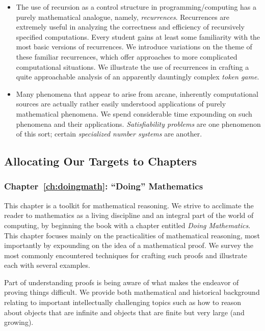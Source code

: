 \begin{enumerate}
\begin{itemize}
\medskip\item
The use of recursion as a control structure in programming/computing has a purely mathematical analogue, namely, {\em recurrences}.  Recurrences are extremely useful in analyzing the correctness and efficiency of recursively specified computations.  Every student gains at least some familiarity with the most basic versions of recurrences.  We introduce variations on the theme of these familiar recurrences, which offer approaches to more complicated computational situations.  We illustrate the use of recurrences in crafting a quite approachable analysis of an apparently dauntingly complex {\em token game}.
\medskip\item
Many phenomena that appear to arise from arcane, inherently computational sources are actually rather easily understood applications of purely mathematical phenomena.  We spend considerable time expounding on such phenomena and their applications.   {\em Satisfiability problems} are one phenomenon of this sort; certain {\em specialized number systems} are another.
\end{itemize}
\end{enumerate}


\subsection{Allocating Our Targets to Chapters}
\label{sec:the chapters}

\subsubsection{Chapter~\ref{ch:doingmath}: ``Doing'' Mathematics}

This chapter is a toolkit for mathematical reasoning.  We strive to acclimate the reader to mathematics as a living discipline and an integral part of the world of computing, by beginning the book with a chapter entitled {\it Doing Mathematics}.  This chapter focuses mainly on the practicalities of mathematical reasoning, most importantly by expounding on the idea of a mathematical proof.  We survey the most commonly encountered techniques for crafting such
proofs and illustrate each with several examples.

\smallskip

Part of understanding proofs is being aware of what makes the endeavor of proving things difficult.  We provide both mathematical and historical background relating to important intellectually challenging topics such as how to reason about objects that are infinite and objects that are finite but very large (and growing).

